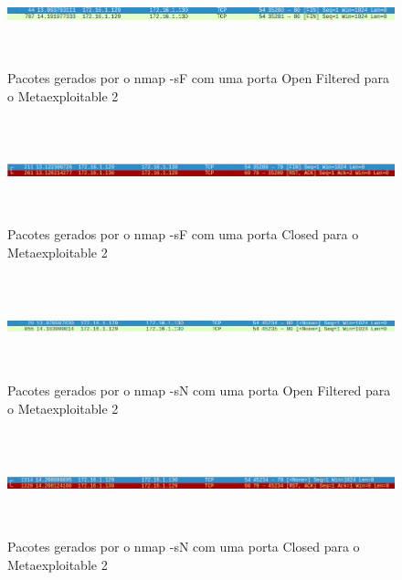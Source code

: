 \begin{figure}[h!]
	\centering
		
	\includegraphics[width=\textwidth,height=3cm,keepaspectratio]{images/nmapsFmetaOF.png}
		
	\caption{Pacotes gerados por o nmap -sF com uma porta Open Filtered para o Metaexploitable 2}
		
	\label{fig:nmapsFmetaOF}
\end{figure}

\begin{figure}[h!]
	\centering
		
	\includegraphics[width=\textwidth,height=3cm,keepaspectratio]{images/nmapsFmetaC.png}
		
	\caption{Pacotes gerados por o nmap -sF com uma porta Closed para o Metaexploitable 2}
		
	\label{fig:nmapsFmetaC}
\end{figure}


\begin{figure}[h!]
	\centering
		
	\includegraphics[width=\textwidth,height=3cm,keepaspectratio]{images/nmapsNmetaOF.png}
		
	\caption{Pacotes gerados por o nmap -sN com uma porta Open Filtered para o Metaexploitable 2}
		
	\label{fig:nmapsNmetaOF}
\end{figure}

\begin{figure}[h!]
	\centering
		
	\includegraphics[width=\textwidth,height=3cm,keepaspectratio]{images/nmapsNmetaC.png}
		
	\caption{Pacotes gerados por o nmap -sN com uma porta Closed para o Metaexploitable 2}
		
	\label{fig:nmapsNmetaC}
\end{figure}


